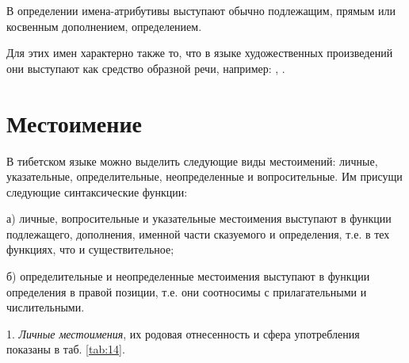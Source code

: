 В определении имена-атрибутивы выступают обычно подлежащим, прямым или косвенным дополнением, определением.

Для этих имен характерно также то, что в языке художественных произведений они выступают как средство образной речи, например:
, .


\section{Местоимение}

В тибетском языке можно выделить следующие виды местоимений: личные, указательные, определительные, неопределенные и вопросительные. Им присущи следующие синтаксические функции:

а) личные, вопросительные и указательные местоимения выступают в функции подлежащего, дополнения, именной части сказуемого и определения, т.е. в тех функциях, что и существительное;

б) определительные и неопределенные местоимения выступают в функции определения в правой позиции, т.е. они соотносимы с прилагательными и числительными.

1. \emph{Личные местоимения}, их родовая отнесенность и сфера употребления показаны в  таб. \ref{tab:14}.

